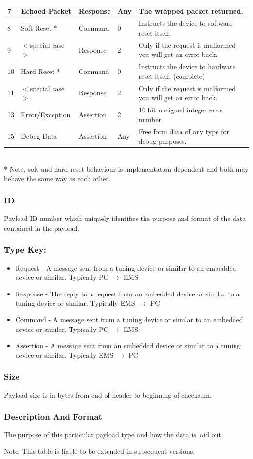 \documentclass[12pt,a4paper,titlepage]{article}
\begin{document}
\begin{tabular}{|l|p{2cm}|l|l|p{7cm}|}
\hline 7        & Echoed Packet & Response & Any & The wrapped packet returned.\\
\hline 8        & Soft Reset * & Command & 0 & Instructs the device to software reset itself.\\
\hline 9        & $<$special case$>$ & Response & 2 & Only if the request is malformed you will get an error back.\\
\hline 10       & Hard Reset * & Command & 0 & Instructs the device to hardware reset itself. (complete)\\
\hline 11       & $<$special case$>$ & Response & 2 & Only if the request is malformed you will get an error back.\\
\hline 13       & Error/Exception & Assertion & 2 & 16 bit unsigned integer error number.\\
\hline 15       & Debug Data & Assertion & Any & Free form data of any type for debug purposes.\\
\hline
\end{tabular}\\
* Note, soft and hard reset behaviour is implementation
dependent and both may behave the same way as each other.
\normalsize


\subsubsection*{ID}
Payload ID number which uniquely identifies the purpose and format of the data
contained in the payload.

\subsubsection*{Type Key:}
\begin{itemize}
\item Request - A message sent from a tuning device or similar to an embedded
device or similar. Typically PC $\rightarrow$ EMS
\item Response - The reply to a request from an embedded device or similar to a
tuning device or similar. Typically EMS $\rightarrow$ PC
\item Command - A message sent from a tuning device or similar to an embedded
device or similar. Typically PC $\rightarrow$ EMS
\item Assertion - A message sent from an embedded device or similar to a tuning
device or similar. Typically EMS $\rightarrow$ PC
\end{itemize}

\subsubsection*{Size}
Payload size is in bytes from end of header to beginning of checksum.

\subsubsection*{Description And Format}
The purpose of this particular payload type and how the data is laid out.

Note: This table is liable to be extended in subsequent
versions.
\end{document}
